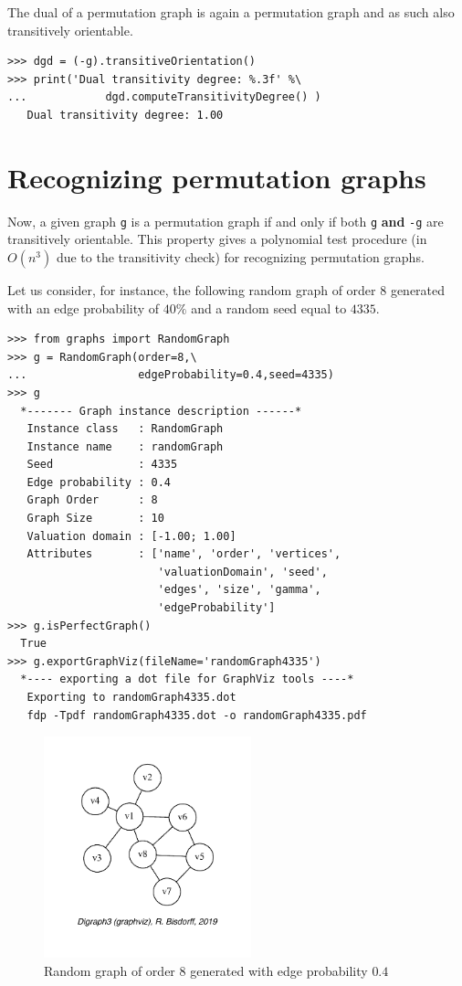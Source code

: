 The dual of a permutation graph is again a permutation graph and as such also transitively orientable.
\begin{lstlisting}
>>> dgd = (-g).transitiveOrientation()
>>> print('Dual transitivity degree: %.3f' %\
...            dgd.computeTransitivityDegree() )
   Dual transitivity degree: 1.00
\end{lstlisting}

\section{Recognizing permutation graphs}
\label{sec:23.4}

Now, a given graph \texttt{g} is a permutation graph if and only if both \texttt{g} \textbf{and} \texttt{-g} are transitively orientable. This  property gives a polynomial test procedure (in $O(n^3)$ due to the transitivity check) for recognizing permutation graphs.

Let us consider, for instance, the following random graph of order 8 generated with an edge probability of $40\%$ and a random seed equal to $4335$.
\begin{lstlisting}
>>> from graphs import RandomGraph
>>> g = RandomGraph(order=8,\
...                 edgeProbability=0.4,seed=4335)
>>> g
  *------- Graph instance description ------*
   Instance class   : RandomGraph
   Instance name    : randomGraph
   Seed             : 4335
   Edge probability : 0.4
   Graph Order      : 8
   Graph Size       : 10
   Valuation domain : [-1.00; 1.00]
   Attributes       : ['name', 'order', 'vertices',
                       'valuationDomain', 'seed',
                       'edges', 'size', 'gamma',
                       'edgeProbability']
>>> g.isPerfectGraph()
  True
>>> g.exportGraphViz(fileName='randomGraph4335')
  *---- exporting a dot file for GraphViz tools ----*
   Exporting to randomGraph4335.dot
   fdp -Tpdf randomGraph4335.dot -o randomGraph4335.pdf
\end{lstlisting}		    
\begin{figure}[ht]
\sidecaption[t]
\includegraphics[width=6cm]{Figures/23-8-randomGraph4335.pdf}
\caption{Random graph of order 8 generated with edge probability $0.4$} 
\label{fig:23.8}       %
\end{figure}

